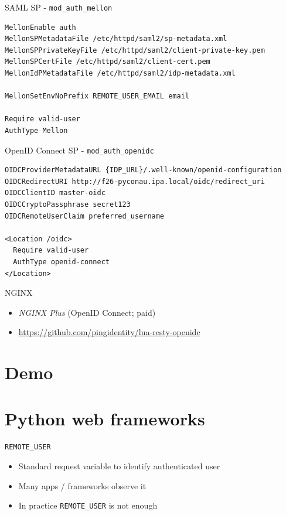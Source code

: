 \documentclass[ignorenonframetext,aspectratio=169]{beamer}
\providecommand{\tightlist}{%
  \setlength{\itemsep}{0pt}\setlength{\parskip}{0pt}}
\begin{document}
\begin{frame}[fragile]{SAML SP - \texttt{mod\_auth\_mellon}}

\begin{verbatim}
MellonEnable auth
MellonSPMetadataFile /etc/httpd/saml2/sp-metadata.xml
MellonSPPrivateKeyFile /etc/httpd/saml2/client-private-key.pem
MellonSPCertFile /etc/httpd/saml2/client-cert.pem
MellonIdPMetadataFile /etc/httpd/saml2/idp-metadata.xml

MellonSetEnvNoPrefix REMOTE_USER_EMAIL email

Require valid-user
AuthType Mellon
\end{verbatim}

\end{frame}

\begin{frame}[fragile]{OpenID Connect SP - \texttt{mod\_auth\_openidc}}

\begin{verbatim}
OIDCProviderMetadataURL {IDP_URL}/.well-known/openid-configuration
OIDCRedirectURI http://f26-pyconau.ipa.local/oidc/redirect_uri
OIDCClientID master-oidc
OIDCCryptoPassphrase secret123
OIDCRemoteUserClaim preferred_username

<Location /oidc>
  Require valid-user
  AuthType openid-connect
</Location>
\end{verbatim}

\end{frame}

\begin{frame}[fragile]{NGINX}
\begin{itemize}
\tightlist
\item {\em NGINX Plus} (OpenID Connect; paid)
\item \url{https://github.com/pingidentity/lua-resty-openidc}
\end{itemize}
\end{frame}

\section{Demo}

\section{Python web frameworks}

\begin{frame}{\tt REMOTE\_USER}
\begin{itemize}
\tightlist
\item Standard request variable to identify authenticated user
\item Many apps / frameworks observe it
\item In practice {\tt REMOTE\_USER} is not enough
\end{itemize}
\end{frame}
\end{document}
